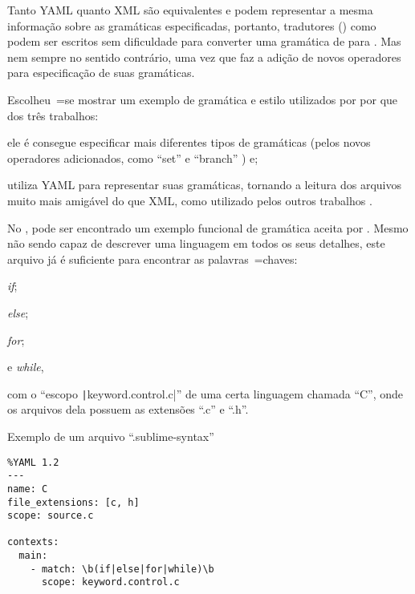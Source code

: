 Tanto YAML quanto XML são equivalentes e
podem representar a mesma informação sobre as gramáticas especificadas,
portanto,
tradutores () como  podem ser escritos sem dificuldade para converter uma gramática de  para .
Mas nem sempre no sentido contrário,
uma vez que  faz a adição de novos operadores para especificação de suas gramáticas.

Escolheu~=se mostrar um exemplo de gramática e
estilo utilizados por  por que dos três trabalhos:
\begin{inparaenum}[1)]
\item ele é consegue especificar mais diferentes tipos de gramáticas (pelos novos operadores adicionados,
como ``set'' e
``branch'' \cite{branchTemporarilyHighlightsWrong}) e;
\item utiliza YAML para representar suas gramáticas,
tornando a leitura dos arquivos muito mais amigável do que XML,
como utilizado pelos outros trabalhos \cite{textMateEditor,vsCodeSyntaxHighlighthing}.
\end{inparaenum}%
No ,
pode ser encontrado um exemplo funcional de gramática aceita por .
Mesmo não sendo capaz de descrever uma linguagem em todos os seus detalhes,
este arquivo já é suficiente para encontrar as palavras~=chaves:
\begin{inparaenum}[1)]
\item \textit{if};
\item \textit{else};
\item \textit{for};
\item e
\textit{while},
\end{inparaenum}%
com o ``escopo \texttt|keyword.control.c|'' de uma certa linguagem chamada ``C'',
onde os arquivos dela possuem as extensões ``.c'' e
``.h''.
\begin{code}
\caption{Exemplo de um arquivo ``.sublime-syntax''}
\label{exemploDeUmArquivoSublimeSyntax}
\begin{verbatim}
%YAML 1.2
---
name: C
file_extensions: [c, h]
scope: source.c

contexts:
  main:
    - match: \b(if|else|for|while)\b
      scope: keyword.control.c
\end{verbatim}
\xpretocmd{\ABNTEXfontereduzida}{\setlength{\belowcaptionskip}{-13pt}}{}{}
\vspace{13pt}
\end{code}

